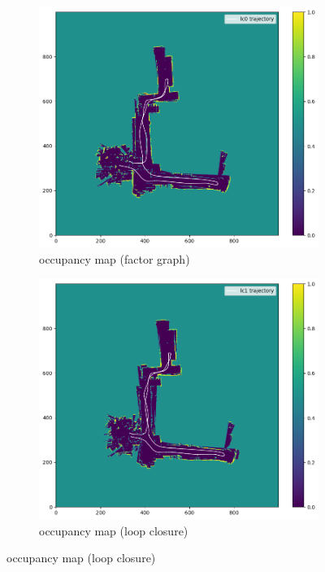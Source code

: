 \documentclass[conference]{IEEEtran}
\begin{document}
\begin{figure}[htbp]
\begin{subfigure}{0.24\textwidth}
        \label{fig:omap_20_icp}
    \end{subfigure}
    \hfill
    \begin{subfigure}{0.24\textwidth}
        \includegraphics[width=\linewidth]{../img/omap_20_lc0.png}
        \caption{occupancy map (factor graph)}
        \label{fig:omap_20_lc0}
    \end{subfigure}
    \hfill
    \begin{subfigure}{0.24\textwidth}
        \includegraphics[width=\linewidth]{../img/omap_20_lc1.png}
        \caption{occupancy map (loop closure)}
        \label{fig:omap_20_lc1}
    \end{subfigure}
    

\end{figure}
\end{document}

